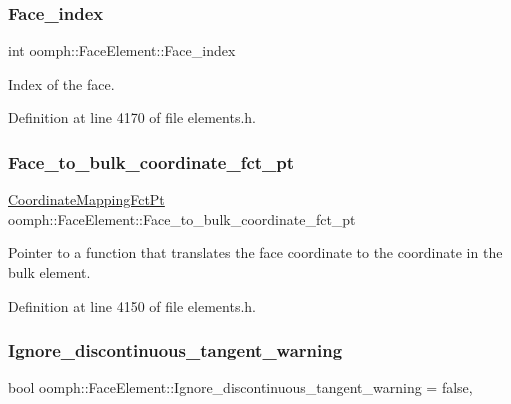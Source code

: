 \subsubsection{\texorpdfstring{Face\+\_\+index}{Face\_index}}
{\footnotesize\ttfamily int oomph\+::\+Face\+Element\+::\+Face\+\_\+index\hspace{0.3cm}{\ttfamily [private]}}



Index of the face. 



Definition at line 4170 of file elements.\+h.

\mbox{\label{classoomph_1_1FaceElement_ad679fad61e43e7a537df4f7b148f0ebc}} 
\subsubsection{\texorpdfstring{Face\+\_\+to\+\_\+bulk\+\_\+coordinate\+\_\+fct\+\_\+pt}{Face\_to\_bulk\_coordinate\_fct\_pt}}
{\footnotesize\ttfamily \hyperlink{classoomph_1_1FaceElement_aaa3af8b5d2e9584bdcd9b133990d7591}{Coordinate\+Mapping\+Fct\+Pt} oomph\+::\+Face\+Element\+::\+Face\+\_\+to\+\_\+bulk\+\_\+coordinate\+\_\+fct\+\_\+pt\hspace{0.3cm}{\ttfamily [private]}}



Pointer to a function that translates the face coordinate to the coordinate in the bulk element. 



Definition at line 4150 of file elements.\+h.

\mbox{\label{classoomph_1_1FaceElement_a95ac8141871cfe5353667b64fddee734}} 
\subsubsection{\texorpdfstring{Ignore\+\_\+discontinuous\+\_\+tangent\+\_\+warning}{Ignore\_discontinuous\_tangent\_warning}}
{\footnotesize\ttfamily bool oomph\+::\+Face\+Element\+::\+Ignore\+\_\+discontinuous\+\_\+tangent\+\_\+warning = false\hspace{0.3cm}{\ttfamily [static]}, {\ttfamily [private]}}



